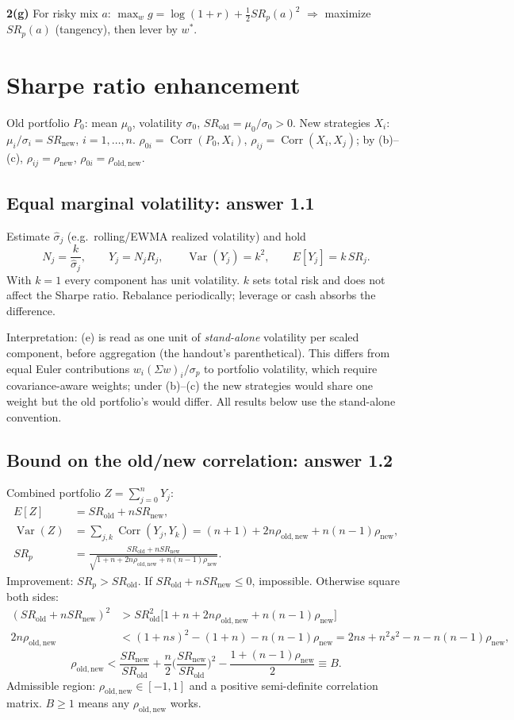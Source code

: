 \documentclass[11pt,letterpaper]{article}
\newcommand{\SRo}{SR_{\mathrm{old}}}
\newcommand{\SRn}{SR_{\mathrm{new}}}
\newcommand{\RhoOn}{\rho_{\mathrm{old,new}}}
\newcommand{\RhoNew}{\rho_{\mathrm{new}}}
\begin{document}
\textbf{2(g)} For risky mix $a$: $\max_wg=\log(1+r)+\frac12SR_p(a)^2$ $\Rightarrow$ maximize $SR_p(a)$ (tangency), then lever by $w^*$.
\clearpage

\section{Sharpe ratio enhancement}
Old portfolio $P_0$: mean $\mu_0$, volatility $\sigma_0$, $\SRo=\mu_0/\sigma_0>0$. New strategies $X_i$: $\mu_i/\sigma_i=\SRn$, $i=1,\dots,n$. $\rho_{0i}=\operatorname{Corr}(P_0,X_i)$, $\rho_{ij}=\operatorname{Corr}(X_i,X_j)$; by (b)--(c), $\rho_{ij}=\RhoNew$, $\rho_{0i}=\RhoOn$.

\subsection*{Equal marginal volatility: answer 1.1}
Estimate $\hat\sigma_j$ (e.g.\ rolling/EWMA realized volatility) and hold
\[
N_j=\frac{k}{\hat\sigma_j},\qquad Y_j=N_jR_j,\qquad \operatorname{Var}(Y_j)=k^2,\qquad E[Y_j]=k\,SR_j .
\]
With $k=1$ every component has unit volatility. $k$ sets total risk and does not affect the Sharpe ratio. Rebalance periodically; leverage or cash absorbs the difference.

Interpretation: (e) is read as one unit of \emph{stand-alone} volatility per scaled component, before aggregation (the handout's parenthetical). This differs from equal Euler contributions $w_i(\Sigma w)_i/\sigma_p$ to portfolio volatility, which require covariance-aware weights; under (b)--(c) the new strategies would share one weight but the old portfolio's would differ. All results below use the stand-alone convention.

\subsection*{Bound on the old/new correlation: answer 1.2}
Combined portfolio $Z=\sum_{j=0}^nY_j$:
\begin{align}
E[Z]&=\SRo+n\SRn,\\
\operatorname{Var}(Z)&=\sum_{j,k}\operatorname{Corr}(Y_j,Y_k)=(n+1)+2n\RhoOn+n(n-1)\RhoNew,\\
SR_p&=\frac{\SRo+n\SRn}{\sqrt{1+n+2n\RhoOn+n(n-1)\RhoNew}} .\label{eq:sr}
\end{align}
Improvement: $SR_p>\SRo$. If $\SRo+n\SRn\le0$, impossible. Otherwise square both sides:
\begin{align*}
(\SRo+n\SRn)^2&>\SRo^2\big[1+n+2n\RhoOn+n(n-1)\RhoNew\big]\\
2n\RhoOn&<(1+ns)^2-(1+n)-n(n-1)\RhoNew=2ns+n^2s^2-n-n(n-1)\RhoNew,
\end{align*}
\begin{equation}
\boxed{\RhoOn<\frac{\SRn}{\SRo}+\frac n2\Big(\frac{\SRn}{\SRo}\Big)^2-\frac{1+(n-1)\RhoNew}{2}\equiv B.}\label{eq:B}
\end{equation}
Admissible region: $\RhoOn\in[-1,1]$ and a positive semi-definite correlation matrix. $B\ge1$ means any $\RhoOn$ works.
\end{document}
